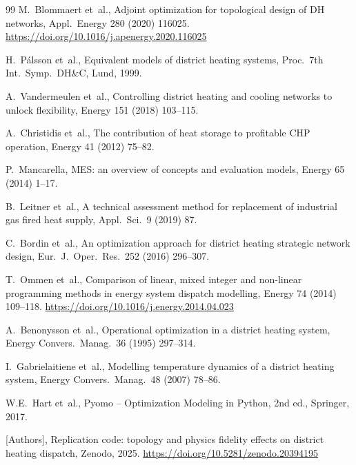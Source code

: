 \documentclass[review,3p]{elsarticle}
\begin{document}
\begin{thebibliography}{99}
M.~Blommaert et~al.,
Adjoint optimization for topological design of DH networks,
Appl.\ Energy 280 (2020) 116025.
\url{https://doi.org/10.1016/j.apenergy.2020.116025}

H.~P\'{a}lsson et~al.,
Equivalent models of district heating systems,
Proc.\ 7th Int.\ Symp.\ DH\&C, Lund, 1999.

A.~Vandermeulen et~al.,
Controlling district heating and cooling networks to unlock
flexibility,
Energy 151 (2018) 103--115.

A.~Christidis et~al.,
The contribution of heat storage to profitable CHP operation,
Energy 41 (2012) 75--82.

P.~Mancarella,
MES: an overview of concepts and evaluation models,
Energy 65 (2014) 1--17.

B.~Leitner et~al.,
A technical assessment method for replacement of industrial gas fired
heat supply,
Appl.\ Sci.\ 9 (2019) 87.

C.~Bordin et~al.,
An optimization approach for district heating strategic network
design,
Eur.\ J.\ Oper.\ Res.\ 252 (2016) 296--307.

T.~Ommen et~al.,
Comparison of linear, mixed integer and non-linear programming
methods in energy system dispatch modelling,
Energy 74 (2014) 109--118.
\url{https://doi.org/10.1016/j.energy.2014.04.023}

A.~Benonysson et~al.,
Operational optimization in a district heating system,
Energy Convers.\ Manag.\ 36 (1995) 297--314.

I.~Gabrielaitiene et~al.,
Modelling temperature dynamics of a district heating system,
Energy Convers.\ Manag.\ 48 (2007) 78--86.

W.E.~Hart et~al.,
Pyomo -- Optimization Modeling in Python, 2nd ed., Springer, 2017.

[Authors], Replication code: topology and physics fidelity effects on
district heating dispatch, Zenodo, 2025.
\url{https://doi.org/10.5281/zenodo.20394195}

\end{thebibliography}

\appendix
\end{document}
